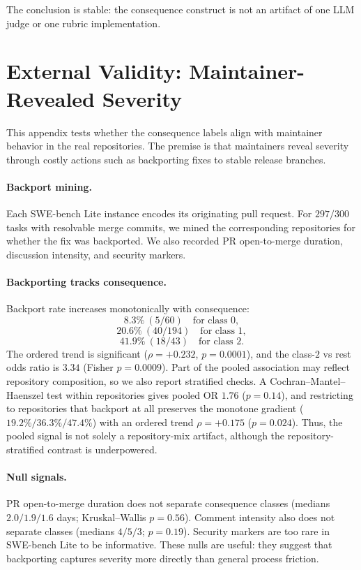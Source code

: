 \documentclass{article}
\begin{document}
The conclusion is stable: the consequence construct is not an artifact
of one LLM judge or one rubric implementation.

\section{External Validity: Maintainer-Revealed Severity}
\label{app:realcost}

This appendix tests whether the consequence labels align with
maintainer behavior in the real repositories. The premise is that
maintainers reveal severity through costly actions such as backporting
fixes to stable release branches.

\paragraph{Backport mining.}
Each SWE-bench Lite instance encodes its originating pull request. For
$297/300$ tasks with resolvable merge commits, we mined the
corresponding repositories for whether the fix was backported. We also
recorded PR open-to-merge duration, discussion intensity, and security
markers.

\paragraph{Backporting tracks consequence.}
Backport rate increases monotonically with consequence:
\[
8.3\% \ (5/60) \quad \text{for class }0,
\]
\[
20.6\% \ (40/194) \quad \text{for class }1,
\]
\[
41.9\% \ (18/43) \quad \text{for class }2.
\]
The ordered trend is significant ($\rho=+0.232$, $p=0.0001$), and the
class-$2$ vs rest odds ratio is $3.34$ (Fisher $p=0.0009$). Part of
the pooled association may reflect repository composition, so we also
report stratified checks. A Cochran--Mantel--Haenszel test within
repositories gives pooled OR $1.76$ ($p=0.14$), and restricting to
repositories that backport at all preserves the monotone gradient
($19.2\%/36.3\%/47.4\%$) with an ordered trend
$\rho=+0.175$ ($p=0.024$). Thus, the pooled signal is not solely a
repository-mix artifact, although the repository-stratified contrast is
underpowered.

\paragraph{Null signals.}
PR open-to-merge duration does not separate consequence classes
(medians $2.0/1.9/1.6$ days; Kruskal--Wallis $p=0.56$). Comment
intensity also does not separate classes (medians $4/5/3$;
$p=0.19$). Security markers are too rare in SWE-bench Lite to be
informative. These nulls are useful: they suggest that backporting
captures severity more directly than general process friction.
\end{document}
